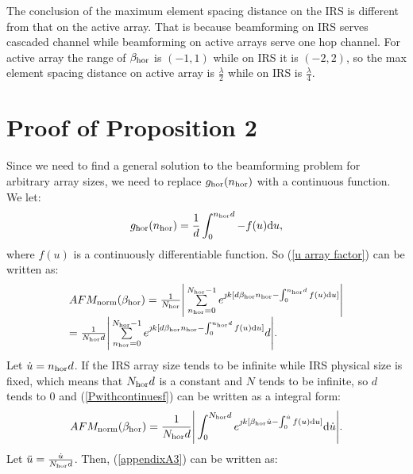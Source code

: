 \documentclass[12pt,draftclsnofoot,onecolumn]{IEEEtran}
\begin{document}
	\begin{remark}
		The conclusion of the maximum element spacing distance  on the IRS is different from that on the active array. That is because beamforming on IRS serves cascaded channel while beamforming on active arrays serve one hop channel. For active array the range of $\beta_{\rm hor}$ is $(-1,1)$ while on IRS it is $(-2,2)$, so the max element spacing distance on active array is $\frac{\lambda}{2}$ while on IRS is $\frac{\lambda}{4}$.
	\end{remark}
	
	
	\section{Proof of Proposition 2}\label{appendixA}
	Since we need to find a general solution to the beamforming problem for arbitrary array sizes, we need to replace $g_{\rm hor}(n_{\rm hor})$ with a continuous function. We let:
	\begin{equation}
		{g_{\rm hor}}({n_{\rm hor}}) = \frac{1}{d}\int_0^{{n_{\rm hor}}d} { - f(u){\rm d}u},
	\end{equation}
	where $f(u)$ is a continuously differentiable function.  So (\ref{u array factor}) can be written as:
	\begin{equation}\label{Pwithcontinuesf}
		\begin{array}{l}
			AFM_{\rm norm}({\beta _{\rm hor}}) =\frac{1}{N_{\rm hor}} \Bigg|\sum\limits_{{n_{\rm hor}} = 0}^{N_{\rm hor} - 1} {{e^{{\jmath}k[d{\beta _{\rm hor}}{n_{\rm hor}} - \int_0^{{n_{\rm hor}}d} {f(u){\rm d}u} ]}}} \Bigg|\\
			=\frac{1}{N_{\rm hor}d} \Bigg|\sum\limits_{{n_{\rm hor}} = 0}^{N_{\rm hor} - 1} {{e^{{\jmath}k[d{\beta _{\rm hor}}{n_{\rm hor}} - \int_0^{{n_{\rm hor}}d} {f(u){\rm d}u} ]}}} d \Bigg|.
		\end{array}
	\end{equation}
	Let $\dot{u}=n_{\rm hor}d$. If the IRS array size tends to be infinite while IRS physical size is fixed, which means that $N_{\rm hor}d$ is a constant and $N$ tends to be infinite, so $d$ tends to $0$ and  (\ref{Pwithcontinuesf}) can be written as a integral form:
	\begin{equation}\label{appendixA3}
		AFM_{\rm norm}({\beta _{\rm hor}}) =\frac{1}{N_{\rm hor}d} \Bigg|\int_0^{N_{\rm hor}d} {{e^{{\jmath}k[{\beta _{\rm hor}}\dot{u} - \int_0^{\dot{u}} {f(u){\rm d}u]} }}} {\rm d}\dot{u}\Bigg|.
	\end{equation}
	Let $\ddot{u}=\frac{\dot{u}}{N_{\rm hor}d}$. Then, (\ref{appendixA3}) can be written as:
\end{document}
